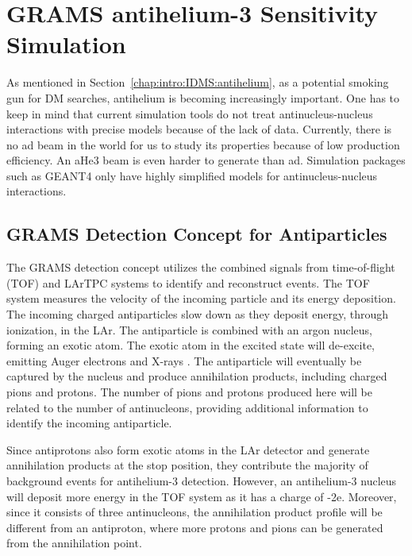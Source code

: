 \section{GRAMS antihelium-3 Sensitivity Simulation}
\label{chap:GRAMSresult:antihelium-3}
As mentioned in Section~\ref{chap:intro:IDMS:antihelium}, as a potential smoking gun for \ac{DM} searches, antihelium is becoming increasingly important. One has to keep in mind that current simulation tools do not treat antinucleus-nucleus interactions with precise models because of the lack of data. Currently, there is no \ac{ad} beam in the world for us to study its properties because of low production efficiency. An \ac{aHe3} beam is even harder to generate than \ac{ad}. Simulation packages such as GEANT4 only have highly simplified models for antinucleus-nucleus interactions. 

\subsection{GRAMS Detection Concept for Antiparticles}
\label{chap:GRAMSresult:antihelium-3:DetectionConcept}

The GRAMS detection concept utilizes the combined signals from time-of-flight (TOF) and LArTPC systems to identify and reconstruct events. The TOF system measures the velocity of the incoming particle and its energy deposition. The incoming charged antiparticles slow down as they deposit energy, through ionization, in the LAr. The antiparticle is combined with an argon nucleus, forming an exotic atom. The exotic atom in the excited state will de-excite, emitting Auger electrons and X-rays \cite{aramaki2013measurement}. The antiparticle will eventually be captured by the nucleus and produce annihilation products, including charged pions and protons. The number of pions and protons produced here will be related to the number of antinucleons, providing additional information to identify the incoming antiparticle.

Since antiprotons also form exotic atoms in the LAr detector and generate annihilation products at the stop position, they contribute the majority of background events for antihelium-3 detection. However, an antihelium-3 nucleus will deposit more energy in the TOF system as it has a charge of -2e. Moreover, since it consists of three antinucleons, the annihilation product profile will be different from an antiproton, where more protons and pions can be generated from the annihilation point.

